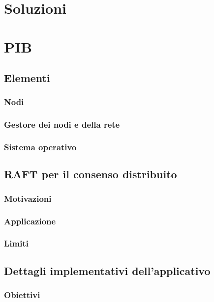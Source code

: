 \documentclass[a4paper]{article}
\begin{document}
\section{Soluzioni}

\section{PIB}
\subsection{Elementi}
\subsubsection{Nodi}

\subsubsection{Gestore dei nodi e della rete}

\subsubsection{Sistema operativo}

\subsection{RAFT per il consenso distribuito}
\subsubsection{Motivazioni}

\subsubsection{Applicazione}

\subsubsection{Limiti}

\subsection{Dettagli implementativi dell'applicativo}
\subsubsection{Obiettivi}
\end{document}
